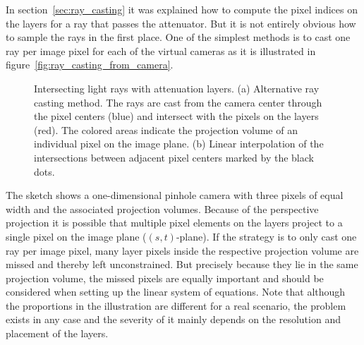 In section~\ref{sec:ray_casting} it was explained how to compute the pixel indices on the layers for a ray that passes the attenuator.
But it is not entirely obvious how to sample the rays in the first place.
One of the simplest methods is to cast one ray per image pixel for each of the virtual cameras as it is illustrated in figure~\ref{fig:ray_casting_from_camera}. 
\begin{figure}[tb]
	\subcaptionbox{\label{fig:ray_casting_from_camera}}{}\hfill %
	\subcaptionbox{\label{fig:interpolation_on_layers}}{}
	\caption[Intersecting light rays with attenuation layers]
			{Intersecting light rays with attenuation layers.
			 (a) Alternative ray casting method. 
			 	 The rays are cast from the camera center through the pixel centers (blue) and intersect with the pixels on the layers (red).
			 	 The colored areas indicate the projection volume of an individual pixel on the image plane.
			 (b) Linear interpolation of the intersections between adjacent pixel centers marked by the black dots.}
\end{figure}
The sketch shows a one-dimensional pinhole camera with three pixels of equal width and the associated projection volumes.
Because of the perspective projection it is possible that multiple pixel elements on the layers project to a single pixel on the image plane (\mbox{$(s,t)$-plane}).
If the strategy is to only cast one ray per image pixel, many layer pixels inside the respective projection volume are missed and thereby left unconstrained.
But precisely because they lie in the same projection volume, the missed pixels are equally important and should be considered when setting up the linear system of equations.
Note that although the proportions in the illustration are different for a real scenario, the problem exists in any case and the severity of it mainly depends on the resolution and placement of the layers. 


